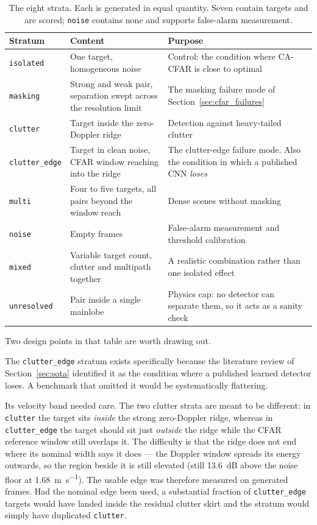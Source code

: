 \begin{table}[htbp]
\centering
\caption{The eight strata. Each is generated in equal quantity. Seven contain targets and are
scored; \texttt{noise} contains none and supports false-alarm measurement.}
\label{tab:strata}
\begin{tabular}{@{}p{2.9cm}p{5.8cm}p{4.2cm}@{}}
\toprule
\textbf{Stratum} & \textbf{Content} & \textbf{Purpose} \\
\midrule
\texttt{isolated} & One target, homogeneous noise & Control: the condition where CA-CFAR is
close to optimal \\
\addlinespace
\texttt{masking} & Strong and weak pair, separation swept across the resolution limit &
The masking failure mode of Section~\ref{sec:cfar_failures} \\
\addlinespace
\texttt{clutter} & Target inside the zero-Doppler ridge & Detection against heavy-tailed clutter \\
\addlinespace
\texttt{clutter\_edge} & Target in clean noise, CFAR window reaching into the ridge &
The clutter-edge failure mode. Also the condition in which a published CNN
\emph{loses}~\cite{yavuz2021radcnn} \\
\addlinespace
\texttt{multi} & Four to five targets, all pairs beyond the window reach & Dense scenes without
masking \\
\addlinespace
\texttt{noise} & Empty frames & False-alarm measurement and threshold calibration \\
\addlinespace
\texttt{mixed} & Variable target count, clutter and multipath together & A realistic combination
rather than one isolated effect \\
\addlinespace
\texttt{unresolved} & Pair inside a single mainlobe & Physics cap: no detector can separate them,
so it acts as a sanity check \\
\bottomrule
\end{tabular}
\end{table}

Two design points in that table are worth drawing out.

The \texttt{clutter\_edge} stratum exists specifically because the literature review of
Section~\ref{sec:sota} identified it as the condition where a published learned detector loses. A
benchmark that omitted it would be systematically flattering.

Its velocity band needed care. The two clutter strata are meant to be different: in
\texttt{clutter} the target sits \emph{inside} the strong zero-Doppler ridge, whereas in
\texttt{clutter\_edge} the target should sit just \emph{outside} the ridge while the CFAR reference
window still overlaps it. The difficulty is that the ridge does not end where its nominal width
says it does --- the Doppler window spreads its energy outwards, so the region beside it is still
elevated (still \SI{13.6}{\deci\bel} above the noise floor at \SI{1.68}{\metre\per\second}). The
usable edge was therefore measured on generated frames. Had the nominal edge
been used, a substantial fraction of \texttt{clutter\_edge} targets would have landed inside the
residual clutter skirt and the stratum would simply have duplicated \texttt{clutter}.

